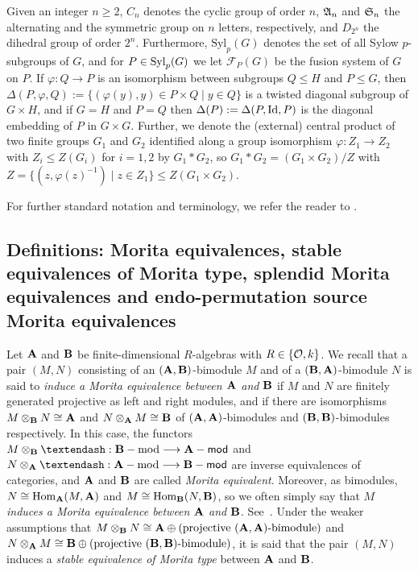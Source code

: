 \par
Given an integer $n\geq 2$, 
$C_n$ denotes the cyclic group of order $n$, ${\mathfrak{A}}_n$ and ${\mathfrak{S}}_n$ the alternating and the symmetric group on $n$ letters, respectively, and $D_{2^n}$ the dihedral group of order $2^n$. 
Furthermore,   ${\mathrm{Syl}}_p(G)$ denotes  the set of all Sylow $p$-subgroups of $G$, and for $P\in\operatorname{Syl}_p(G)$ we let $\mathcal F_P(G)$ be the fusion system of $G$ on $P$. 
If $\varphi:Q\longrightarrow P$ is an isomorphism between subgroups $Q\leq H$ and $P\leq G$, then $\Delta(P,\varphi,Q):=\{(\varphi(y),y)\in P\times Q\mid y\in Q\}$
is a twisted diagonal subgroup of $G\times H$, and if $G=H$ and $P=Q$ then $\Delta(P):=\Delta(P,\operatorname{Id},P)$ is the diagonal embedding of $P$ in $G\times G$. Further, we denote the (external) central product of two finite groups $G_1$ and $G_2$ identified along a group isomorphism $\varphi:Z_1\longrightarrow Z_2$ with $Z_i\leq Z(G_i)$ for $i=1,2$ by $G_1\ast G_2$, so 
$G_1\ast G_2=(G_1\times G_2)/Z$ with $Z=\{(z,\varphi(z)^{-1})\mid z\in Z_1\}\leq Z(G_1\times G_2)$.
\par
For further standard notation and terminology, we refer the reader to \cite{LinckelmannVol1,LinckelmannVol2,NagaoTsushimaBook,ThevenazBook}.

\vspace{2mm}
\subsection{Definitions: Morita equivalences, stable equivalences of Morita type, splendid Morita equivalences and endo-permutation source Morita equivalences}\label{ssec:Splendid_Morita_equivalences}{\leavevmode}%

\noindent Let ${\mathbf{A}}$ and ${\mathbf{B}}$ be finite-dimensional $R$-algebras with $R\in\{{\mathcal{O}},k\}$. We recall that a pair $(M,N)$ consisting of an $({\mathbf{A}},{\mathbf{B}})$-bimodule $M$ and of a $({\mathbf{B}},{\mathbf{A}})$-bimodule $N$ is said to \emph{induce a Morita
equivalence between ${\mathbf{A}}$ and ${\mathbf{B}}$} if $M$ and $N$ are finitely generated projective as left
and right modules, and if there are isomorphisms $M\otimes_{{\mathbf{B}}} N\cong {\mathbf{A}}$ and $N\otimes_{{\mathbf{A}}}M\cong {\mathbf{B}}$ of $({\mathbf{A}},{\mathbf{A}})$-bimodules and $({\mathbf{B}},{\mathbf{B}})$-bimodules respectively. In this case, the functors $M\otimes_{\bB}–:\bB-\mathrm{mod}\longrightarrow \bA-\mathsf{mod}$ and $N\otimes_{\bA}–:\bA-\mathrm{mod}\longrightarrow \bB-\mathsf{mod}$ are inverse equivalences of categories, and ${\mathbf{A}}$ and ${\mathbf{B}}$ are called \emph{Morita equivalent}.  Moreover, as bimodules, $N\cong  \operatorname{Hom}_{{\mathbf{A}}}(M,{\mathbf{A}})$ and $M\cong \operatorname{Hom}_{{\mathbf{B}}}(N,{\mathbf{B}})$, so we often simply say that $M$ \emph{induces a Morita
equivalence between ${\mathbf{A}}$ and ${\mathbf{B}}$}.  See~\cite[Theorem~2.8.2]{LinckelmannVol1}. 
Under the weaker assumptions that $M\otimes_{{\mathbf{B}}} N\cong {\mathbf{A}}\oplus(\text{projective $({\mathbf{A}},{\mathbf{A}})$-bimodule})$ and $N\otimes_{{\mathbf{A}}}M\cong {\mathbf{B}}\oplus(\text{projective $({\mathbf{B}},{\mathbf{B}})$-bimodule})$,  it is said that the pair $(M,N)$ induces a \emph{stable equivalence of Morita type} between ${\mathbf{A}}$ and ${\mathbf{B}}$. 

